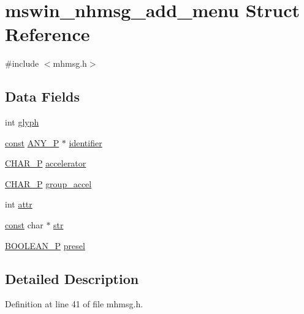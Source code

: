 \hypertarget{structmswin__nhmsg__add__menu}{\section{mswin\+\_\+nhmsg\+\_\+add\+\_\+menu Struct Reference}
\label{structmswin__nhmsg__add__menu}
}


{\ttfamily \#include $<$mhmsg.\+h$>$}

\subsection*{Data Fields}
\begin{DoxyCompactItemize}
\item 
int \hyperlink{structmswin__nhmsg__add__menu_a6be452cac105dee1671e9e61bafb58ae}{glyph}
\item 
\hyperlink{tradstdc_8h_a2c212835823e3c54a8ab6d95c652660e}{const} \hyperlink{wintype_8h_ae29f750de92b8a7c2566957e5863fbed}{A\+N\+Y\+\_\+\+P} $\ast$ \hyperlink{structmswin__nhmsg__add__menu_a5ce3f435709df4a7e6442cebba1593ee}{identifier}
\item 
\hyperlink{wingem1_8c_ada878a8b4864a1658ee0f0acd5a89412}{C\+H\+A\+R\+\_\+\+P} \hyperlink{structmswin__nhmsg__add__menu_abad930c46c0bc05bff9e362d191e6255}{accelerator}
\item 
\hyperlink{wingem1_8c_ada878a8b4864a1658ee0f0acd5a89412}{C\+H\+A\+R\+\_\+\+P} \hyperlink{structmswin__nhmsg__add__menu_a5ad28b8447917e56539afb498fffc98a}{group\+\_\+accel}
\item 
int \hyperlink{structmswin__nhmsg__add__menu_a01defd06f0fe00fc1b1986744ad288c9}{attr}
\item 
\hyperlink{tradstdc_8h_a2c212835823e3c54a8ab6d95c652660e}{const} char $\ast$ \hyperlink{structmswin__nhmsg__add__menu_affef89042e33c9d34265eadc957330d6}{str}
\item 
\hyperlink{wingem1_8c_aa2723cc3af18a5199ab4ce7cca84d82b}{B\+O\+O\+L\+E\+A\+N\+\_\+\+P} \hyperlink{structmswin__nhmsg__add__menu_aff828569cd76f607d077f89e23383938}{presel}
\end{DoxyCompactItemize}


\subsection{Detailed Description}


Definition at line 41 of file mhmsg.\+h.



